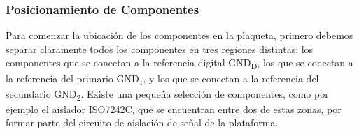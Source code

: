 \subsubsection{Posicionamiento de Componentes}

Para comenzar la ubicación de los componentes en la plaqueta, primero debemos separar claramente todos los componentes en tres regiones distintas: los componentes que se conectan a la referencia digital GND\textsubscript{D}, los que se conectan a la referencia del primario GND\textsubscript{1}, y los que se conectan a la referencia del secundario GND\textsubscript{2}. Existe una pequeña selección de componentes, como por ejemplo el aislador ISO7242C, que se encuentran entre dos de estas zonas, por formar parte del circuito de aislación de señal de la plataforma.\\ 

\lipsum[4]\\

\newpage\afterpage{\blankpage}

